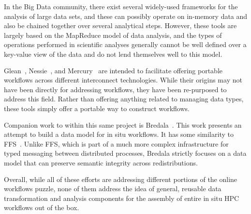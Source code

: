 In the Big Data community, there exist several
widely-used frameworks for the analysis of large
data sets, and these can possibly operate on in-memory
data and also be chained together over several
analytical steps. However, these tools are largely
based on the MapReduce model of data analysis,
and the types of operations performed
in scientific analyses generally cannot
be well defined over a key-value view of the data
and do not lend themselves well to this model.

Glean~\cite{vishwanath:2011:glean}, Nessie~\cite{oldfield:lwfs-data-movement},
and Mercury~\cite{Soumagne:2013:mercury} are intended to facilitate offering
portable workflows across different interconnect technologies. While their
origins may not have been directly for addressing workflows, they have been
re-purposed to address this field. Rather than offering anything related to
managing data types, these tools simply offer a portable way to construct
workflows.
\fi

Companion work to \sys within this same project is
Bredala~\cite{dreher:2016:bredala}. This work presents an attempt to build a
data model for in situ workflows. It has some similarity to
FFS~\cite{eisenhauer:2011:ffs}. Unlike FFS, which is part of a much more
complex infrastructure for typed messaging between distributed processes,
Bredala strictly focuses on a data model that can preserve
semantic integrity across redistributions.

Overall, while all of these efforts are addressing different portions of the
online workflows puzzle, none of them address the idea of general,
reusable data transformation and analysis components for the assembly
of entire in situ HPC workflows out of the box.

